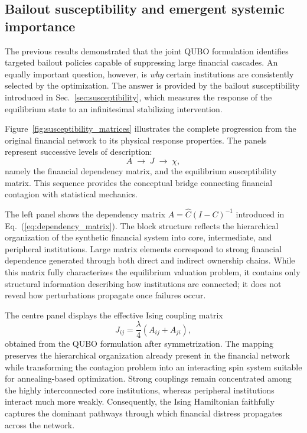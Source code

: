 \documentclass[aps,reprint,superscriptaddress,pra]{revtex4-2}
\begin{document}
\subsection{Bailout susceptibility and emergent systemic importance}

The previous results demonstrated that the joint QUBO formulation identifies targeted bailout policies capable of suppressing large financial cascades. An equally important question, however, is \emph{why} certain institutions are consistently selected by the optimization. The answer is provided by the bailout susceptibility introduced in Sec.~\ref{sec:susceptibility}, which measures the response of the equilibrium state to an infinitesimal stabilizing intervention.

Figure~\ref{fig:susceptibility_matrices} illustrates the complete progression from the original financial network to its physical response properties. The panels represent successive levels of description:
\[
A
\;\longrightarrow\;
J
\;\longrightarrow\;
\chi,
\]
namely the financial dependency matrix, and the equilibrium susceptibility matrix. This sequence provides the conceptual bridge connecting financial contagion with statistical mechanics.

The left panel shows the dependency matrix $A=\hat C(I-C)^{-1}$ introduced in Eq.~(\ref{eq:dependency_matrix}). The block structure reflects the hierarchical organization of the synthetic financial system into core, intermediate, and peripheral institutions. Large matrix elements correspond to strong financial dependence generated through both direct and indirect ownership chains. While this matrix fully characterizes the equilibrium valuation problem, it contains only structural information describing how institutions are connected; it does not reveal how perturbations propagate once failures occur.

The centre panel displays the effective Ising coupling matrix
\[
J_{ij}
=
\frac{\lambda}{4}
(A_{ij}+A_{ji}),
\]
obtained from the QUBO formulation after symmetrization. The mapping preserves the hierarchical organization already present in the financial network while transforming the contagion problem into an interacting spin system suitable for annealing-based optimization. Strong couplings remain concentrated among the highly interconnected core institutions, whereas peripheral institutions interact much more weakly. Consequently, the Ising Hamiltonian faithfully captures the dominant pathways through which financial distress propagates across the network.
\end{document}

